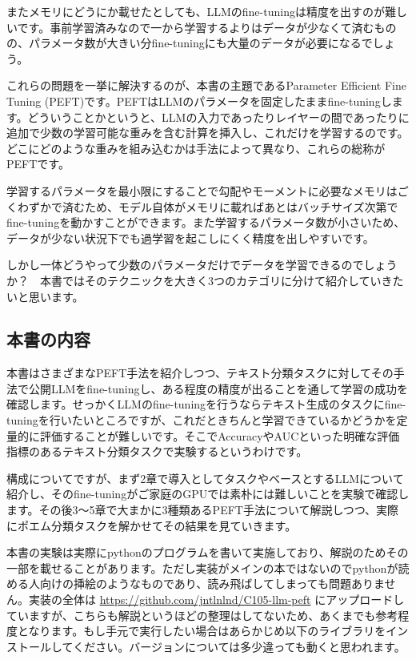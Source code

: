\documentclass[a5paper,twoside,dvipdfmx]{jsarticle}
\begin{document}
またメモリにどうにか載せたとしても、LLMのfine-tuningは精度を出すのが難しいです。事前学習済みなので一から学習するよりはデータが少なくて済むものの、パラメータ数が大きい分fine-tuningにも大量のデータが必要になるでしょう。

これらの問題を一挙に解決するのが、本書の主題であるParameter Efficient Fine Tuning (\textsf{PEFT})です。PEFTはLLMのパラメータを固定したままfine-tuningします。どういうことかというと、LLMの入力であったりレイヤーの間であったりに追加で少数の学習可能な重みを含む計算を挿入し、これだけを学習するのです。どこにどのような重みを組み込むかは手法によって異なり、これらの総称がPEFTです。

学習するパラメータを最小限にすることで勾配やモーメントに必要なメモリはごくわずかで済むため、モデル自体がメモリに載ればあとはバッチサイズ次第でfine-tuningを動かすことができます。また学習するパラメータ数が小さいため、データが少ない状況下でも過学習を起こしにくく精度を出しやすいです。

しかし一体どうやって少数のパラメータだけでデータを学習できるのでしょうか？　本書ではそのテクニックを大きく3つのカテゴリに分けて紹介していきたいと思います。

\subsection{本書の内容}

本書はさまざまなPEFT手法を紹介しつつ、テキスト分類タスクに対してその手法で公開LLMをfine-tuningし、ある程度の精度が出ることを通して学習の成功を確認します。せっかくLLMのfine-tuningを行うならテキスト生成のタスクにfine-tuningを行いたいところですが、これだときちんと学習できているかどうかを定量的に評価することが難しいです。そこでAccuracyやAUCといった明確な評価指標のあるテキスト分類タスクで実験するというわけです。

構成についてですが、まず2章で導入としてタスクやベースとするLLMについて紹介し、そのfine-tuningがご家庭のGPUでは素朴には難しいことを実験で確認します。その後3～5章で大まかに3種類あるPEFT手法について解説しつつ、実際にポエム分類タスクを解かせてその結果を見ていきます。

本書の実験は実際にpythonのプログラムを書いて実施しており、解説のためその一部を載せることがあります。ただし実装がメインの本ではないのでpythonが読める人向けの挿絵のようなものであり、読み飛ばしてしまっても問題ありません。実装の全体は \url{https://github.com/jntlnlnd/C105-llm-peft} にアップロードしていますが、こちらも解説というほどの整理はしてないため、あくまでも参考程度となります。もし手元で実行したい場合はあらかじめ以下のライブラリをインストールしてください。バージョンについては多少違っても動くと思われます。
\end{document}
